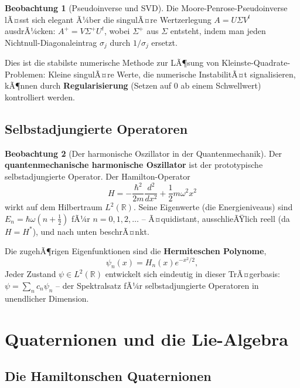 ﻿\documentclass[a4paper,12pt]{report}
\theoremstyle{definition}
\newtheorem{beobachtung}{Beobachtung}
\begin{document}
\begin{beobachtung}[Pseudoinverse und SVD]
    Die Moore-Penrose-Pseudoinverse lÃ¤sst sich elegant Ã¼ber die
    singulÃ¤re Wertzerlegung $A = U\Sigma V^t$ ausdrÃ¼cken:
    $A^+ = V \Sigma^+ U^t$, wobei $\Sigma^+$ aus $\Sigma$ entsteht,
    indem man jeden Nichtnull-Diagonaleintrag $\sigma_j$ durch
    $1/\sigma_j$ ersetzt.

    Dies ist die stabilste numerische Methode zur LÃ¶sung von
    Kleinste-Quadrate-Problemen: Kleine singulÃ¤re Werte, die
    numerische InstabilitÃ¤t signalisieren, kÃ¶nnen durch
    \textbf{Regularisierung} (Setzen auf $0$ ab einem Schwellwert)
    kontrolliert werden.
\end{beobachtung}
\section{Selbstadjungierte Operatoren}

\begin{beobachtung}[Der harmonische Oszillator in der Quantenmechanik]
    Der \textbf{quantenmechanische harmonische Oszillator} ist der
    prototypische selbstadjungierte Operator. Der Hamilton-Operator
    \[
        H = -\frac{\hbar^2}{2m}\frac{d^2}{dx^2} + \frac{1}{2}m\omega^2 x^2
    \]
    wirkt auf dem Hilbertraum $L^2(\mathbb{R})$. Seine Eigenwerte
    (die Energieniveaus) sind $E_n = \hbar\omega(n + \frac{1}{2})$
    fÃ¼r $n = 0, 1, 2, \ldots$ -- Ã¤quidistant, ausschlieÃŸlich reell
    (da $H = H^*$), und nach unten beschrÃ¤nkt.

    Die zugehÃ¶rigen Eigenfunktionen sind die \textbf{Hermiteschen Polynome},
    \[
        \psi_n(x) = H_n(x) e^{-x^2/2},
    \]
    Jeder Zustand $\psi \in L^2(\mathbb{R})$ entwickelt sich eindeutig
    in dieser TrÃ¤gerbasis: $\psi = \sum_n c_n \psi_n$ -- der
    Spektralsatz fÃ¼r selbstadjungierte Operatoren in
    unendlicher Dimension.
\end{beobachtung}

\chapter{Quaternionen und die Lie-Algebra}

\section{Die Hamiltonschen Quaternionen}
\end{document}
